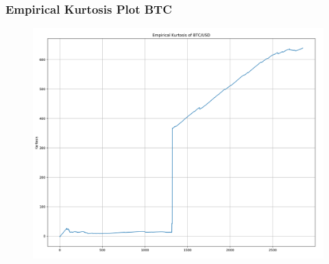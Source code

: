 \documentclass{beamer}
\begin{document}
\begin{frame}
\frametitle{Empirical Kurtosis Plot BTC}
\begin{figure}[h!]
\includegraphics[width=\textwidth]{btc_returns_kurtosis.png}
\end{figure}

\end{frame}
\end{document}
